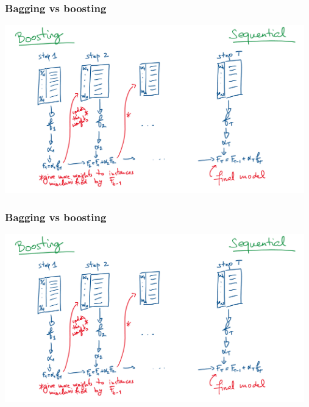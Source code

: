 \begin{frame}
\frametitle{Bagging vs boosting}
\includegraphics[width=13cm, page=1]{../Graphs/Bagging_Boosting_Illustrations.png}
\end{frame}
\begin{frame}
\frametitle{Bagging vs boosting}
\includegraphics[width=13cm, page=2]{../Graphs/Bagging_Boosting_Illustrations.png}
\end{frame}

